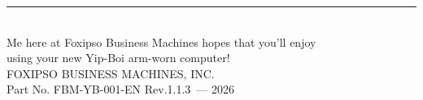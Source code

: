 \documentclass[10pt]{article}
\newcommand{\manualversion}{1.1.3}
\begin{document}
\vfill
\begin{center}
\textcolor{rulecolor}{\rule{0.5\textwidth}{0.8pt}}\\[0.5em]
{\footnotesize\ttfamily
Me here at Foxipso Business Machines hopes that you'll enjoy\\
using your new Yip-Boi arm-worn computer!\\[0.5em]
FOXIPSO BUSINESS MACHINES, INC.\\[0.3em]
Part No. FBM-YB-001-EN Rev.\manualversion\ --- 2026}
\end{center}
\end{document}
